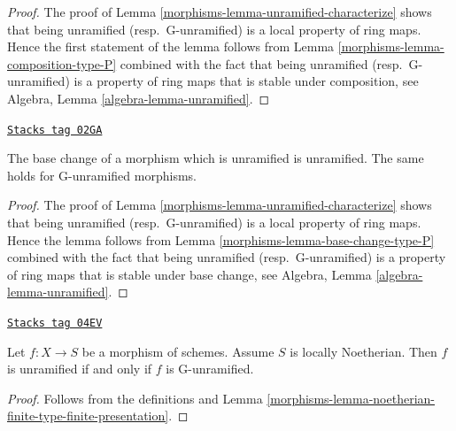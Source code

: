 \begin{proof}

The proof of Lemma \ref{morphisms-lemma-unramified-characterize}
shows that being unramified (resp.\ G-unramified)
is a local property of ring maps.
Hence the first statement of the lemma follows from
Lemma \ref{morphisms-lemma-composition-type-P} combined
with the fact that being unramified (resp.\ G-unramified)
is a property of ring maps that is stable under composition, see
Algebra, Lemma \ref{algebra-lemma-unramified}.
\end{proof}

\begin{lemma}
\label{morphisms-lemma-base-change-unramified}
\href{https://stacks.math.columbia.edu/tag/02GA}{\texttt{Stacks tag 02GA}}

The base change of a morphism which is unramified is unramified.
The same holds for G-unramified morphisms.
\end{lemma}

\begin{proof}

The proof of Lemma \ref{morphisms-lemma-unramified-characterize}
shows that being unramified (resp.\ G-unramified)
is a local property of ring maps. Hence the lemma follows from
Lemma \ref{morphisms-lemma-base-change-type-P} combined
with the fact that being unramified (resp.\ G-unramified)
is a property of ring maps that is stable under base change, see
Algebra, Lemma \ref{algebra-lemma-unramified}.
\end{proof}

\begin{lemma}
\label{morphisms-lemma-noetherian-unramified}
\href{https://stacks.math.columbia.edu/tag/04EV}{\texttt{Stacks tag 04EV}}

Let $f : X \to S$ be a morphism of schemes. Assume $S$ is locally Noetherian.
Then $f$ is unramified if and only if $f$ is G-unramified.
\end{lemma}

\begin{proof}

Follows from the definitions and
Lemma \ref{morphisms-lemma-noetherian-finite-type-finite-presentation}.
\end{proof}


